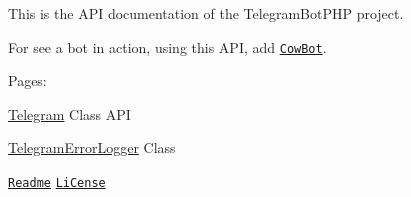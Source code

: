 This is the A\-P\-I documentation of the Telegram\-Bot\-P\-H\-P project.\par
 For see a bot in action, using this A\-P\-I, add \href{https://telegram.me/cowmooobot}{\tt Cow\-Bot}.\par
 Pages\-:\par
 \hyperlink{class_telegram}{Telegram} Class A\-P\-I \par
 \hyperlink{class_telegram_error_logger}{Telegram\-Error\-Logger} Class\par
 \href{md__home_travis_build__eleirbag89__telegram_bot_p_h_p__r_e_a_d_m_e.html}{\tt Readme} \href{md__home_travis_build__eleirbag89__telegram_bot_p_h_p__l_i_c_e_n_s_e.html}{\tt Li\-Cense} 